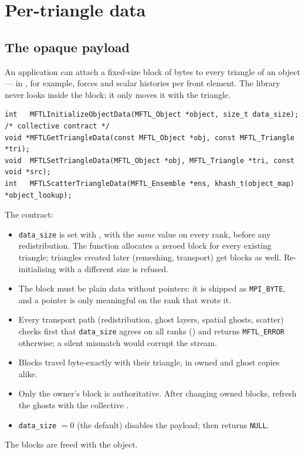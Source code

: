 \chapter{Per-triangle data}
\label{ch:data}

\section{The opaque payload}

An application can attach a fixed-size block of bytes to every triangle of an object --- in
\multi{}, for example, forces and scalar histories per front element. The library never looks
inside the block; it only moves it with the triangle.

\begin{lstlisting}[numbers=none]
int   MFTLInitializeObjectData(MFTL_Object *object, size_t data_size);   /* collective contract */
void *MFTLGetTriangleData(const MFTL_Object *obj, const MFTL_Triangle *tri);
void  MFTLSetTriangleData(MFTL_Object *obj, MFTL_Triangle *tri, const void *src);
int   MFTLScatterTriangleData(MFTL_Ensemble *ens, khash_t(object_map) *object_lookup);
\end{lstlisting}
The contract:
\begin{itemize}
  \item \texttt{data\_size} is set with , with the \emph{same} value
    on every rank, before any redistribution. The function allocates a zeroed block for every
    existing triangle; triangles created later (remeshing, transport) get blocks as well.
    Re-initialising with a different size is refused.
  \item The block must be plain data without pointers: it is shipped as \texttt{MPI\_BYTE}, and a
    pointer is only meaningful on the rank that wrote it.
  \item Every transport path (redistribution, ghost layers, spatial ghosts, scatter) checks first
    that \texttt{data\_size} agrees on all ranks () and
    returns \texttt{MFTL\_ERROR} otherwise; a silent mismatch would corrupt the stream.
  \item Blocks travel byte-exactly with their triangle, in owned and ghost copies alike.
  \item Only the owner's block is authoritative. After changing owned blocks, refresh the ghosts
    with the collective .
  \item \texttt{data\_size} $=0$ (the default) disables the payload; 
    then returns \texttt{NULL}.
\end{itemize}
The blocks are freed with the object.

